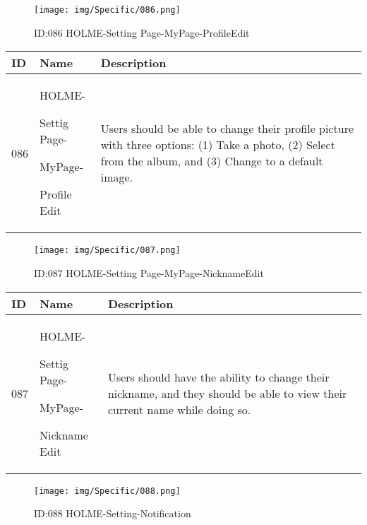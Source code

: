 \documentclass[conference]{IEEEtran}
\begin{document}
\begin{enumerate}
\begin{figure}[h]
\centering                                         
\texttt{[image: img/Specific/086.png]}
\caption{ID:086 HOLME-Setting Page-MyPage-ProfileEdit}
\end{figure}
\begin{table}[h]
\def\arraystretch{1.2} \small
    \begin{tabular}{|p{1cm}|p{1.8cm}|p{5.0cm}|}
        \hline
        ID & Name & Description\\ \hline
         086 \par  & HOLME-\par Settig Page- \par MyPage- \par Profile Edit & 
        Users should be able to change their profile picture with three options: (1) Take a photo, (2) Select from the album, and (3) Change to a default image.
         \\ \hline
    \end{tabular}
\end{table}
\begin{figure}[h]
\centering                                         
\texttt{[image: img/Specific/087.png]}
\caption{ID:087 HOLME-Setting Page-MyPage-NicknameEdit}
\end{figure}
\begin{table}[h]
\def\arraystretch{1.2} \small
    \begin{tabular}{|p{1cm}|p{1.8cm}|p{5.0cm}|}
        \hline
        ID & Name & Description\\ \hline
         087 \par  & HOLME-\par Settig Page- \par MyPage- \par Nickname Edit & 
        Users should have the ability to change their nickname, and they should be able to view their current name while doing so.
         \\ \hline
    \end{tabular}
\end{table}
\begin{figure}[h]
\centering                                         
\texttt{[image: img/Specific/088.png]}
\caption{ID:088 HOLME-Setting-Notification}
\end{figure}
\begin{table}[h]
\def\arraystretch{1.2} \small
    \begin{tabular}{|p{1cm}|p{1.8cm}|p{5.0cm}|}

\end{tabular}
\end{table}
\end{enumerate}
\end{document}
